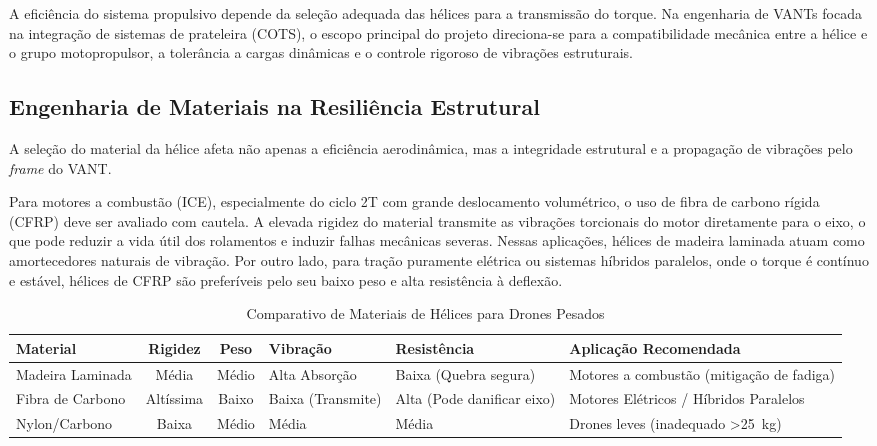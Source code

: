 \documentclass[a4paper,12pt]{article}
\begin{document}
A eficiência do sistema propulsivo depende da seleção adequada das hélices para a transmissão do torque. Na engenharia de VANTs focada na integração de sistemas de prateleira (COTS), o escopo principal do projeto direciona-se para a compatibilidade mecânica entre a hélice e o grupo motopropulsor, a tolerância a cargas dinâmicas e o controle rigoroso de vibrações estruturais.

\subsection{Engenharia de Materiais na Resiliência Estrutural}
A seleção do material da hélice afeta não apenas a eficiência aerodinâmica, mas a integridade estrutural e a propagação de vibrações pelo \textit{frame} do VANT. 

Para motores a combustão (ICE), especialmente do ciclo 2T com grande deslocamento volumétrico, o uso de fibra de carbono rígida (CFRP) deve ser avaliado com cautela. A elevada rigidez do material transmite as vibrações torcionais do motor diretamente para o eixo, o que pode reduzir a vida útil dos rolamentos e induzir falhas mecânicas severas. Nessas aplicações, hélices de madeira laminada atuam como amortecedores naturais de vibração. Por outro lado, para tração puramente elétrica ou sistemas híbridos paralelos, onde o torque é contínuo e estável, hélices de CFRP são preferíveis pelo seu baixo peso e alta resistência à deflexão.

\begin{table}[H]
\centering
\caption{Comparativo de Materiais de Hélices para Drones Pesados}
\label{tab:helices}
\footnotesize
\begin{tabularx}{\textwidth}{@{} l c c >{\raggedright\arraybackslash}X >{\raggedright\arraybackslash}X >{\raggedright\arraybackslash}X @{}}
\toprule
\textbf{Material} & \textbf{Rigidez} & \textbf{Peso} & \textbf{Vibração} & \textbf{Resistência} & \textbf{Aplicação Recomendada} \\ \midrule
Madeira Laminada & Média & Médio & Alta Absorção & Baixa (Quebra segura) & Motores a combustão (mitigação de fadiga) \\
\addlinespace
Fibra de Carbono & Altíssima & Baixo & Baixa (Transmite) & Alta (Pode danificar eixo) & Motores Elétricos / Híbridos Paralelos \\
\addlinespace
Nylon/Carbono & Baixa & Médio & Média & Média & Drones leves (inadequado >\SI{25}{kg}) \\ \bottomrule
\end{tabularx}
\end{table}
\end{document}
